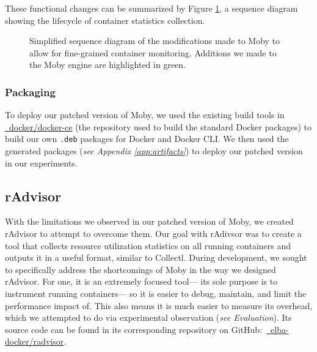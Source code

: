 \documentclass[a4paper,11pt]{article}
\newcommand{\github}[2]{\,\href{https://github.com/#1/#2}{\faGithub~#1/\linebreak[0]#2}\xspace}
\begin{document}
\newcommand{\newcolor}{avocadogreen}
These functional changes can be summarized by Figure \ref{fig:moby_sequence},
a sequence diagram showing the lifecycle of container statistics collection.

\begin{figure}
    \centering
    \vspace{1.5em}
    
    \vspace{0.625em}
    \caption{
        Simplified sequence diagram of the modifications made to Moby
        to allow for fine-grained container monitoring.
        Additions we made to the Moby engine are highlighted in \textcolor{\newcolor}{green}.
    }
    \label{fig:moby_sequence}
    \vspace{1em}
\end{figure}

\pagebreak
\subsubsection{Packaging}

To deploy our patched version of Moby, we used the existing build tools in \github{docker}{docker-ce}
(the repository used to build the standard Docker packages)
to build our own \texttt{.deb} packages for Docker and Docker CLI.
We then used the generated packages
(\textit{see Appendix \ref{app:artifacts}})
to deploy our patched version in our experiments.

\subsection{rAdvisor}

With the limitations we observed in our patched version of Moby,
we created rAdvisor to attempt to overcome them.
Our goal with rAdivsor was to create a tool that collects resource utilization statistics on all running containers
and outputs it in a useful format, similar to Collectl.
During development, we sought to specifically address the shortcomings of Moby
in the way we designed rAdvisor.
For one, it is an extremely focused tool---%
its sole purpose is to instrument running containers---%
so it is easier to debug, maintain, and limit the performance impact of.
This also means it is much easier to measure its overhead,
which we attempted to do via experimental observation (\textit{see Evaluation}).
Its source code can be found in its corresponding repository on GitHub:
\github{elba-docker}{radvisor}.
\end{document}
